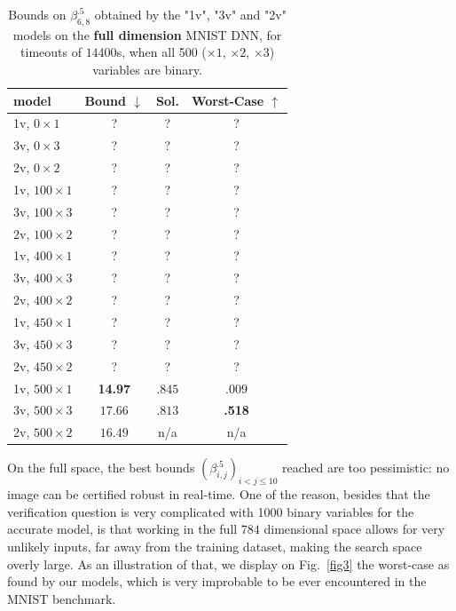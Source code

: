 	
	\begin{table}[h!]
		\centering
	\begin{tabular}{||l||c|c|c||}\hline\hline
		model &        Bound $\downarrow$ &  Sol. &      Worst-Case $\uparrow$ \\\hline \hline
		1v, $0 \times 1$ & ? & ? & ? \\\hline 
		3v, $0 \times 3$ & ? & ? & ? \\\hline 
	    2v, $0 \times 2$ & ? & ? & ? \\\hline\hline	 

		1v, $100 \times 1$ & ? & ? & ? \\\hline 
		3v, $100 \times 3$ & ? & ? & ? \\\hline 
	    2v, $100 \times 2$ & ? & ? & ? \\\hline\hline	 

		1v, $400 \times 1$ & ? & ? & ? \\\hline 
		3v, $400 \times 3$ & ? & ? & ? \\\hline 
	    2v, $400 \times 2$ & ? & ? & ? \\\hline\hline	 

1v, $450 \times 1$ & ? & ? & ? \\\hline 
		3v, $450 \times 3$ & ? & ? & ? \\\hline 
	    2v, $450 \times 2$ & ? & ? & ? \\\hline\hline	 


		
		1v, $500 \times 1$ & {\bf 14.97} & $.845$ & $.009$ \\\hline 
		3v, $500 \times 3$ & $17.66$ & $.813$ & {\bf .518} \\\hline 
	    2v, $500 \times 2$ & $16.49$ & n/a & n/a \\\hline\hline	 
	\end{tabular}
	\caption{Bounds on $\beta^{.5}_{6,8}$ 
	obtained by the "1v", "3v" and "2v" models 
	on the {\bf full dimension} MNIST DNN, 
	for timeouts of $14400$s, when all 500 ($\times 1$, $\times 2$, $\times 3$) variables are binary.}
	\label{table.mnist}
\end{table}

On the full space, the best bounds $(\beta^{.5}_{i,j})_{i < j \leq 10}$ reached are too pessimistic: no image can be certified robust in real-time. One of the reason, besides that the verification question is very complicated with 1000 binary variables for the accurate model, is that working in the full $784$ dimensional space allows for very unlikely inputs, far away from the training dataset, making the search space overly large. As an illustration of that, we display on Fig.~\ref{fig3} the worst-case as found by our models, which is very improbable to be ever encountered in the MNIST benchmark.

